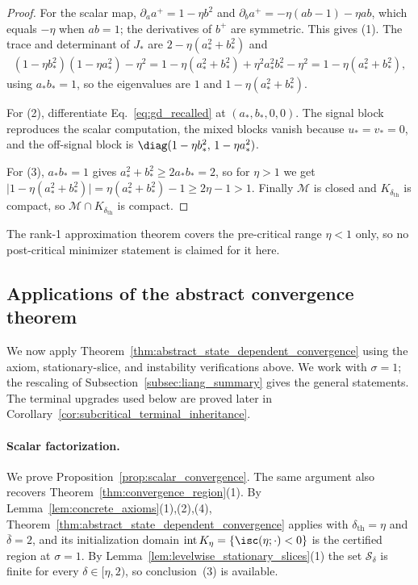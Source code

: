 \documentclass{article}
\begin{document}
\begin{proof}
For the scalar map, $\partial_a a^+=1-\eta b^2$ and
$\partial_b a^+=-\eta(ab-1)-\eta ab$, which equals $-\eta$ when $ab=1$; the
derivatives of $b^+$ are symmetric. This gives (1). The trace and determinant
of $J_\ast$ are $2-\eta(a_\ast^2+b_\ast^2)$ and
\begin{align}
    (1-\eta b_\ast^2)(1-\eta a_\ast^2)-\eta^2
    =
    1-\eta(a_\ast^2+b_\ast^2)+\eta^2a_\ast^2b_\ast^2-\eta^2
    =
    1-\eta(a_\ast^2+b_\ast^2),
\end{align}
using $a_\ast b_\ast=1$, so the eigenvalues are $1$ and
$1-\eta(a_\ast^2+b_\ast^2)$.

For (2), differentiate Eq.~\eqref{eq:gd_recalled} at
$(a_\ast,b_\ast,0,0)$. The signal block reproduces the scalar computation,
the mixed blocks vanish because $u_\ast=v_\ast=0$, and the off-signal block is
$\diag(1-\eta b_\ast^2,\,1-\eta a_\ast^2)$.

For (3), $a_\ast b_\ast=1$ gives $a_\ast^2+b_\ast^2\ge2a_\ast b_\ast=2$, so
for $\eta>1$ we get
$\bigl|1-\eta(a_\ast^2+b_\ast^2)\bigr|=\eta(a_\ast^2+b_\ast^2)-1\ge2\eta-1>1$.
Finally $\mathcal M$ is closed and $K_{\delta_{\mathrm{th}}}$ is compact, so
$\mathcal M\cap K_{\delta_{\mathrm{th}}}$ is compact.
\end{proof}

The rank-1 approximation theorem covers the pre-critical range $\eta<1$ only,
so no post-critical minimizer statement is claimed for it here.

\subsection{Applications of the abstract convergence theorem}
\label{subsec:applications_of_theorem5}

We now apply Theorem~\ref{thm:abstract_state_dependent_convergence} using the
axiom, stationary-slice, and instability verifications above. We work with
$\sigma=1$; the rescaling of Subsection~\ref{subsec:liang_summary} gives the
general statements. The terminal upgrades used below are proved later in
Corollary~\ref{cor:subcritical_terminal_inheritance}.

\paragraph{Scalar factorization.}
We prove Proposition~\ref{prop:scalar_convergence}. The same argument also
recovers Theorem~\ref{thm:convergence_region}(1). By
Lemma~\ref{lem:concrete_axioms}(1),(2),(4),
Theorem~\ref{thm:abstract_state_dependent_convergence} applies with
$\delta_{\mathrm{th}}=\eta$ and $\overline\delta=2$, and its initialization
domain $\operatorname{int}K_\eta=\{\isc(\eta;\cdot)<0\}$ is the certified region
at $\sigma=1$. By
Lemma~\ref{lem:levelwise_stationary_slices}(1) the set $\mathcal S_\delta$ is
finite for every $\delta\in[\eta,2)$, so conclusion~(3) is available.
\end{document}
